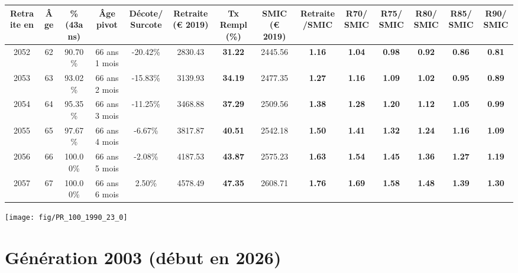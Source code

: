 \begin{adjustbox}{max width=\textwidth} 
\begin{tabular}[htb]{|c|c||c|c|c||c|c||c|c||c|c|c|c|c|} 
\hline 
 Retraite en &  Âge &  \%(43ans) &  Âge pivot &  Décote/Surcote &  Retraite (\euro{} 2019) &  Tx Rempl(\%) &  SMIC (\euro{} 2019) &  Retraite/SMIC &  R70/SMIC &  R75/SMIC &  R80/SMIC &  R85/SMIC &  R90/SMIC \\ 
\hline \hline 
 2052 &  62 &  90.70\% &  66 ans 1 mois &  -20.42\% &  2830.43 &  {\bf 31.22} &  2445.56 &  {\bf 1.16} &  {\bf 1.04} &  {\bf {\color{red} 0.98}} &  {\bf {\color{red} 0.92}} &  {\bf {\color{red} 0.86}} &  {\bf {\color{red} 0.81}} \\ 
\hline 
 2053 &  63 &  93.02\% &  66 ans 2 mois &  -15.83\% &  3139.93 &  {\bf 34.19} &  2477.35 &  {\bf 1.27} &  {\bf 1.16} &  {\bf 1.09} &  {\bf 1.02} &  {\bf {\color{red} 0.95}} &  {\bf {\color{red} 0.89}} \\ 
\hline 
 2054 &  64 &  95.35\% &  66 ans 3 mois &  -11.25\% &  3468.88 &  {\bf 37.29} &  2509.56 &  {\bf 1.38} &  {\bf 1.28} &  {\bf 1.20} &  {\bf 1.12} &  {\bf 1.05} &  {\bf {\color{red} 0.99}} \\ 
\hline 
 2055 &  65 &  97.67\% &  66 ans 4 mois &  -6.67\% &  3817.87 &  {\bf 40.51} &  2542.18 &  {\bf 1.50} &  {\bf 1.41} &  {\bf 1.32} &  {\bf 1.24} &  {\bf 1.16} &  {\bf 1.09} \\ 
\hline 
 2056 &  66 &  100.00\% &  66 ans 5 mois &  -2.08\% &  4187.53 &  {\bf 43.87} &  2575.23 &  {\bf 1.63} &  {\bf 1.54} &  {\bf 1.45} &  {\bf 1.36} &  {\bf 1.27} &  {\bf 1.19} \\ 
\hline 
 2057 &  67 &  100.00\% &  66 ans 6 mois &  2.50\% &  4578.49 &  {\bf 47.35} &  2608.71 &  {\bf 1.76} &  {\bf 1.69} &  {\bf 1.58} &  {\bf 1.48} &  {\bf 1.39} &  {\bf 1.30} \\ 
\hline 
\hline 
\end{tabular} 
\end{adjustbox} 
 
 \vspace{0.1cm} 

 {\hspace{-2.2cm}\texttt{[image: fig/PR\_100\_1990\_23\_0]}} 

\newpage 
 
\section{Génération 2003 (début en 2026)\label{PR_100_2003_23_0}} 
 
